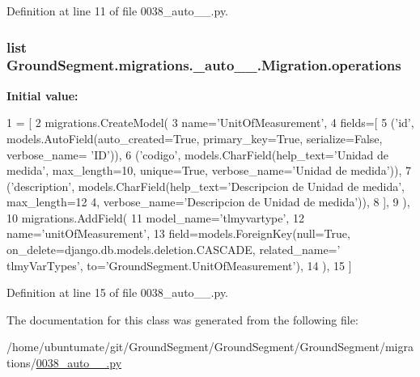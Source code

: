 Definition at line 11 of file 0038\+\_\+auto\+\_\+\_.\+py.

\hypertarget{class_ground_segment_1_1migrations_1_10038__auto__20170131__1736_1_1_migration_aa89898fa66dc9ffaac0f18c0de940d7c}{}
\subsubsection[{operations}]{\setlength{\rightskip}{0pt plus 5cm}list Ground\+Segment.\+migrations.\+\_\+auto\+\_\+\_.\+Migration.\+operations\hspace{0.3cm}{\ttfamily [static]}}\label{class_ground_segment_1_1migrations_1_10038__auto__20170131__1736_1_1_migration_aa89898fa66dc9ffaac0f18c0de940d7c}
{\bfseries Initial value\+:}
\begin{DoxyCode}
1 = [
2         migrations.CreateModel(
3             name=\textcolor{stringliteral}{'UnitOfMeasurement'},
4             fields=[
5                 (\textcolor{stringliteral}{'id'}, models.AutoField(auto\_created=\textcolor{keyword}{True}, primary\_key=\textcolor{keyword}{True}, serialize=\textcolor{keyword}{False}, verbose\_name=\textcolor{stringliteral}{
      'ID'})),
6                 (\textcolor{stringliteral}{'codigo'}, models.CharField(help\_text=\textcolor{stringliteral}{'Unidad de medida'}, max\_length=10, unique=\textcolor{keyword}{True}, 
      verbose\_name=\textcolor{stringliteral}{'Unidad de medida'})),
7                 (\textcolor{stringliteral}{'description'}, models.CharField(help\_text=\textcolor{stringliteral}{'Descripcion de Unidad de medida'}, max\_length=12
      4, verbose\_name=\textcolor{stringliteral}{'Descripcion de Unidad de medida'})),
8             ],
9         ),
10         migrations.AddField(
11             model\_name=\textcolor{stringliteral}{'tlmyvartype'},
12             name=\textcolor{stringliteral}{'unitOfMeasurement'},
13             field=models.ForeignKey(null=\textcolor{keyword}{True}, on\_delete=django.db.models.deletion.CASCADE, related\_name=\textcolor{stringliteral}{'
      tlmyVarTypes'}, to=\textcolor{stringliteral}{'GroundSegment.UnitOfMeasurement'}),
14         ),
15     ]
\end{DoxyCode}


Definition at line 15 of file 0038\+\_\+auto\+\_\+\_.\+py.



The documentation for this class was generated from the following file\+:\begin{DoxyCompactItemize}
\item 
/home/ubuntumate/git/\+Ground\+Segment/\+Ground\+Segment/\+Ground\+Segment/migrations/\hyperlink{0038__auto__20170131__1736_8py}{0038\+\_\+auto\+\_\+\_.\+py}\end{DoxyCompactItemize}
